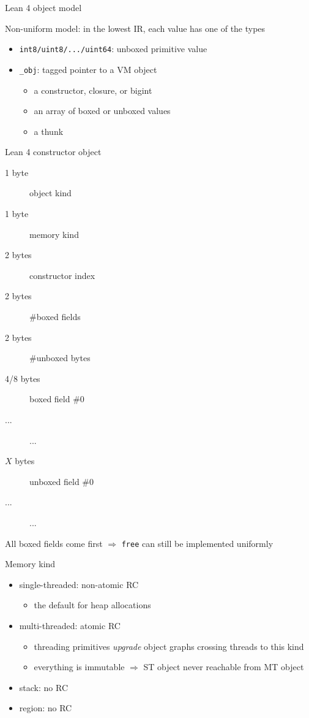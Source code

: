 \documentclass[t]{beamer}
\newcommand{\kit}[1]{\textcolor{KITgreen}{#1}}
\begin{document}
\begin{frame}{Lean 4 object model}

\kit{Non-uniform} model: in the lowest IR, each value has one of the types
\begin{itemize}
\item \texttt{int8/uint8/.../uint64}: \kit{unboxed} primitive value
\item \texttt{\_obj}: tagged pointer to a VM object
  \begin{itemize}
  \item a constructor, closure, or bigint
  \item \kit{an array of boxed or unboxed values}
  \item \kit{a thunk}
  \end{itemize}
\end{itemize}
\end{frame}

\begin{frame}[fragile]{Lean 4 constructor object}
  
  \begin{description}
  \item[1 byte] object kind
  \item[1 byte] \kit{memory kind}
  \item[2 bytes] constructor index
  \item[2 bytes] \#\kit{boxed} fields
  \item[2 bytes] \#\kit{unboxed bytes}
  \item[4/8 bytes] boxed field \#0
  \item [...] ...
  \item[$X$ bytes] unboxed field \#0
  \item [...] ...
  \end{description}

  All boxed fields come first $\Longrightarrow$ \verb!free! can still be implemented uniformly
\end{frame}

\begin{frame}{Memory kind}
  \begin{itemize}
  \item single-threaded: non-atomic RC
    \begin{itemize}
    \item the default for heap allocations
    \end{itemize}
  \item multi-threaded: atomic RC
    \begin{itemize}
    \item threading primitives \emph{upgrade} object graphs crossing threads to
      this kind
    \item everything is immutable $\Longrightarrow$ ST object never reachable from MT object
    \end{itemize}
  \item stack: no RC
  \item region: no RC
  \end{itemize}
\end{frame}
\end{document}
